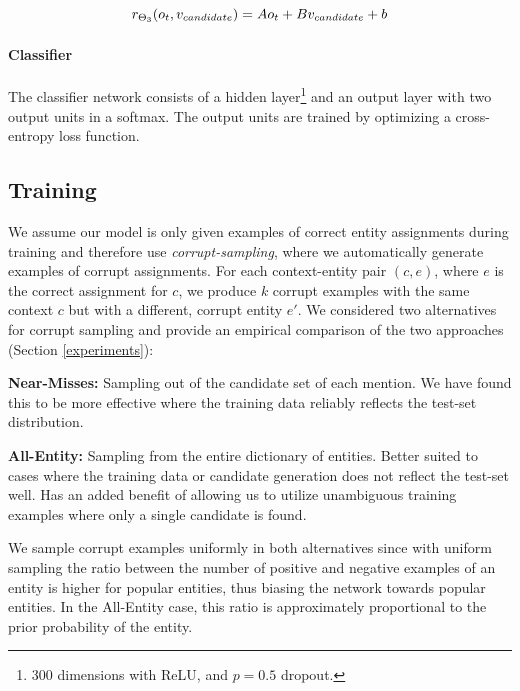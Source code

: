 \documentclass[11pt,letterpaper]{article}
\begin{document}
	\begin{equation}
	\label{eq3}
	r_{\Theta_3}(o_t, v_{candidate}) = Ao_t + Bv_{candidate} + b \\
	\end{equation}
	
	\paragraph{Classifier}
	The classifier network consists of a hidden layer\footnote{300 dimensions with ReLU, and $p=0.5$ dropout.} and an output layer with two output units in a softmax. The output units are trained by optimizing a cross-entropy loss function.
	
	\subsection{Training}
	
	We assume our model is only given examples of correct entity assignments during training and therefore use \textit{corrupt-sampling}, where we automatically generate examples of corrupt assignments. For each context-entity pair $(c,e)$, where $e$ is the correct assignment for $c$, we produce $k$ corrupt examples with the same context $c$ but with a different, corrupt entity $e'$. We considered two alternatives for corrupt sampling and provide an empirical comparison of the two approaches (Section \ref{experiments}):
	
	\begin{description}
	\item{\textbf{Near-Misses:}} 
	Sampling out of the candidate set of each mention. We have found this to be more effective where the training data reliably reflects the test-set distribution.
	\item{\textbf{All-Entity:}} 
	Sampling from the entire dictionary of entities. Better suited to cases where the training data or candidate generation does not reflect the test-set well. Has an added benefit of allowing us to utilize unambiguous training examples where only a single candidate is found.
	\end{description}
	
	We sample corrupt examples uniformly in both alternatives since with uniform sampling the ratio between the number of positive and negative examples of an entity is higher for popular entities, thus biasing the network towards popular entities. In the All-Entity case, this ratio is approximately proportional to the prior probability of the entity. 
	
\end{document}
